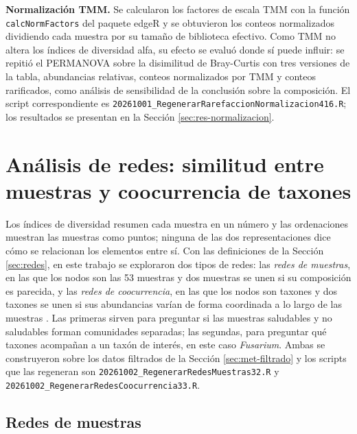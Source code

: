 \textbf{Normalización TMM.} Se calcularon los factores de escala TMM con la función
\texttt{calcNormFactors} del paquete edgeR \citep{robinson2010edger} y se obtuvieron los conteos
normalizados dividiendo cada muestra por su tamaño de biblioteca efectivo. Como TMM no altera los
índices de diversidad alfa, su efecto se evaluó donde sí puede influir: se repitió el PERMANOVA sobre
la disimilitud de Bray-Curtis con tres versiones de la tabla, abundancias relativas, conteos
normalizados por TMM y conteos rarificados, como análisis de sensibilidad de la conclusión sobre la
composición. El script correspondiente es
\texttt{20261001\_RegenerarRarefaccionNormalizacion416.R}; los resultados se presentan en la
Sección \ref{sec:res-normalizacion}.










\section[Redes de muestras y de coocurrencia]{Análisis de redes: similitud entre muestras y coocurrencia de taxones}
\label{sec:met-redes}

Los índices de diversidad resumen cada muestra en un número y las ordenaciones muestran las
muestras como puntos; ninguna de las dos representaciones dice cómo se relacionan los elementos
entre sí. Con las definiciones de la Sección \ref{sec:redes}, en este trabajo se exploraron dos tipos de redes: las \emph{redes de
muestras}, en las que los nodos son las 53 muestras y dos muestras se unen si su composición es
parecida, y las \emph{redes de coocurrencia}, en las que los nodos son taxones y dos taxones se unen
si sus abundancias varían de forma coordinada a lo largo de las muestras
\citep{berry2014deciphering}. Las primeras sirven para preguntar si las muestras saludables y no
saludables forman comunidades separadas; las segundas, para preguntar qué taxones acompañan a un
taxón de interés, en este caso \textit{Fusarium}. Ambas se construyeron sobre los datos filtrados
de la Sección \ref{sec:met-filtrado} y los scripts que las regeneran son
\texttt{20261002\_RegenerarRedesMuestras32.R} y \texttt{20261002\_RegenerarRedesCoocurrencia33.R}.

\subsection{Redes de muestras}

